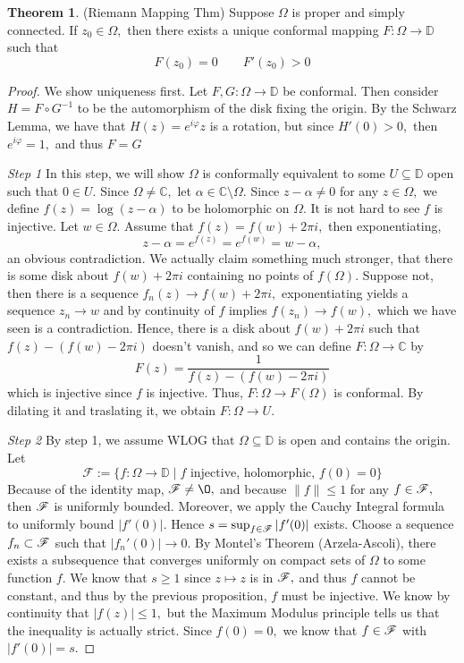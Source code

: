 \documentclass[10pt, oneside]{article}
\newcommand{\bbC}{\mathbb{C}}
\newcommand{\sm}{\setminus}
\theoremstyle{definition}
\newtheorem{thm}{Theorem}
\newcommand{\bbC}{\mathbb{C}}
\renewcommand{\emptyset}{\O}
\newcommand{\sm}{\setminus}
\begin{document}
\begin{thm}
    (Riemann Mapping Thm) Suppose $\Omega$ is proper and simply connected. If $z_0 \in \Omega,$ then there exists a unique conformal mapping $F: \Omega \to \mathbb{D}$ such that 
    \[F(z_0) = 0 \qquad F'(z_0) >0\]
\end{thm}
\begin{proof}
    We show uniqueness first. Let $F,G: \Omega \to \mathbb{D}$ be conformal. Then consider $H = F \circ G^{-1}$ to be the automorphism of the disk fixing the origin. By the Schwarz Lemma, we have that $H(z) = e^{i\varphi} z$ is a rotation, but since $H'(0) >0,$ then $e^{i\varphi} = 1,$ and thus $F = G$

    \textit{Step 1} In this step, we will show $\Omega$ is conformally equivalent to some $U \subseteq \mathbb{D}$ open such that $0 \in U.$ Since $\Omega \neq \bbC,$ let $\alpha \in \bbC \sm \Omega.$ Since $z-\alpha \neq 0$ for any $z\in \Omega,$ we define $f(z)= \log(z - \alpha)$ to be holomorphic on $\Omega.$ It is not hard to see $f$ is injective. Let $w \in \Omega.$ Assume that $f(z) = f(w) + 2\pi i,$ then exponentiating, 
    \[z-\alpha=e^{f(z)} = e^{f(w)} = w-\alpha,\] an obvious contradiction. We actually claim something much stronger, that there is some disk about $f(w)+ 2\pi i$ containing no points of $f(\Omega).$ Suppose not, then there is a sequence $f_n(z)\to f(w) + 2\pi i,$ exponentiating yields a sequence $z_n \to w$ and by continuity of $f$ implies $f(z_n)\to f(w),$ which we have seen is a contradiction. Hence, there is a disk about $f(w) + 2\pi i$ such that $f(z) - (f(w) - 2\pi i)$ doesn't vanish, and so we can define $F: \Omega \to \bbC$ by 
    \[F(z) = \frac{1}{f(z) - (f(w) - 2\pi i)}\] which is injective since $f $ is injective. Thus, $F: \Omega \to F(\Omega)$ is conformal. By dilating it and traslating it, we obtain $F: \Omega \to U.$

    \textit{Step 2} By step 1, we assume WLOG that $\Omega \subseteq \mathbb{D}$ is open and contains the origin. Let 
    \[\mathcal{F}:= \{f: \Omega \to \mathbb{D} \mid f \text{ injective, holomorphic, $f(0) = 0$}\}\]
Because of the identity map, $\mathcal{F}\neq \emptyset,$ and because $\|f\| \leq 1$ for any $f \in \cal F,$ then $\cal F$ is uniformly bounded. Moreover, we apply the Cauchy Integral formula to uniformly bound $|f'(0)|.$ Hence $s = \sup_{f\in \cal F} |f'(0)|$ exists. Choose a sequence $f_n \subset \cal F$ such that $|f_n'(0)|\to 0.$ By Montel's Theorem (Arzela-Ascoli), there exists a subsequence that converges uniformly on compact sets of $\Omega$ to some function $f.$ We know that $s \geq 1$ since $z\mapsto z$ is in $\cal F,$ and thus $f$ cannot be constant, and thus by the previous proposition, $f$ must be injective. We know by continuity that $|f(z)| \leq 1,$ but the Maximum Modulus principle tells us that the inequality is actually strict. Since $f(0) = 0,$ we know that $f \in \cal F$ with $|f'(0)| = s.$   


\end{proof}
\end{document}
